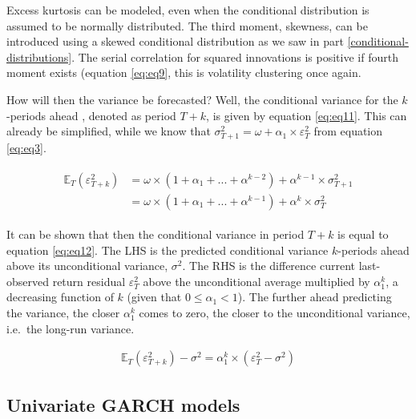 \documentclass[a4paper, twoside]{templates/ociamthesis}
\begin{document}
\noindent Excess kurtosis can be modeled, even when the conditional distribution is assumed to be normally distributed. The third moment, skewness, can be introduced using a skewed conditional distribution as we saw in part \ref{conditional-distributions}. The serial correlation for squared innovations is positive if fourth moment exists (equation \eqref{eq:eq9}, this is volatility clustering once again.

\noindent How will then the variance be forecasted? Well, the conditional variance for the \(k\)-periods ahead , denoted as period \(T+k\), is given by equation \eqref{eq:eq11}. This can already be simplified, while we know that \(\sigma_{T+1}^2 = \omega + \alpha_1 \times \varepsilon_T^2\) from equation \eqref{eq:eq3}.

\begin{align} 
\begin{split}
\mathbb{E}_T(\varepsilon_{T+k}^2) 
&= \omega\times(1+\alpha_1 + ... + \alpha^{k-2}) + \alpha^{k-1}\times\sigma_{T+1}^2 \\
&= \omega\times(1+\alpha_1 + ... + \alpha^{k-1}) + \alpha^{k}\times\sigma_{T}^2
\end{split}
 \label{eq:eq11}
\end{align}

\noindent It can be shown that then the conditional variance in period \(T+k\) is equal to equation \eqref{eq:eq12}. The LHS is the predicted conditional variance \(k\)-periods ahead above its unconditional variance, \(\sigma^2\). The RHS is the difference current last-observed return residual \(\varepsilon_T^2\) above the unconditional average multiplied by \(\alpha_1^k\), a decreasing function of \(k\) (given that \(0 \le\alpha_1 <1\)). The further ahead predicting the variance, the closer \(\alpha_1^k\) comes to zero, the closer to the unconditional variance, i.e.~the long-run variance.

\begin{align} 
\mathbb{E}_T(\varepsilon_{T+k}^2) - \sigma^2 = \alpha_1^k\times(\varepsilon_T^2 - \sigma^2)
 \label{eq:eq12}
\end{align}

\hypertarget{univ-garch}{%
\subsection{Univariate GARCH models}\label{univ-garch}}
\end{document}

